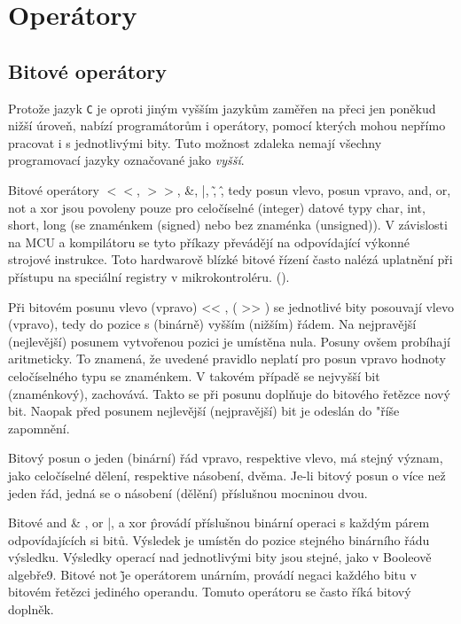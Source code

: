   \section{Operátory}
    \subsection{Bitové  operátory}
      Protože jazyk \texttt{C} je oproti jiným vyšším jazykům zaměřen na přeci jen poněkud nižší 
      úroveň, 
      nabízí programátorům i operátory, pomocí kterých mohou nepřímo pracovat i s jednotlivými bity.
      Tuto možnost zdaleka nemají všechny programovací jazyky označované jako \emph{vyšší}.
      
      Bitové operátory \(<<\), \(>>\), \&, |, \~, \^, tedy posun vlevo, posun vpravo, and, or, not 
      a xor jsou povoleny pouze pro celočíselné (integer) datové typy char, int, short, long (se 
      znaménkem (signed) nebo bez znaménka (unsigned)). V závislosti na MCU a kompilátoru se tyto 
      příkazy převádějí na odpovídající výkonné strojové instrukce. Toto hardwarově blízké bitové 
      řízení často nalézá uplatnění při přístupu na speciální registry v mikrokontroléru. 
      (\cite[s.~79]{Burkhard2003}).
      
      Při bitovém posunu vlevo (vpravo) << , ( >> ) se jednotlivé bity posouvají vlevo (vpravo), 
      tedy do pozice s (binárně) vyšším (nižším) řádem. Na nejpravější (nejlevější) posunem 
      vytvořenou pozici je umístěna nula. Posuny ovšem probíhají aritmeticky. To znamená, že 
      uvedené pravidlo neplatí pro posun vpravo hodnoty celočíselného typu se znaménkem. V takovém 
      případě se nejvyšší bit (znaménkový), zachovává. Takto se při posunu doplňuje do bitového 
      řetězce nový bit. Naopak před posunem nejlevější (nejpravější) bit je odeslán do
      "říše zapomnění.
      
      Bitový posun o jeden (binární) řád vpravo, respektive vlevo, má stejný význam, jako 
      celočíselné dělení, respektive násobení, dvěma. Je-li bitový posun o více než jeden řád, 
      jedná se o násobení (dělění) příslušnou mocninou dvou.
      
      Bitové and \& , or |, a xor \^ provádí příslušnou binární operaci s každým párem 
      odpovídajících si bitů. Výsledek je umístěn do pozice stejného binárního řádu výsledku. 
      Výsledky operací nad jednotlivými bity jsou  stejné, jako v Booleově algebře9. Bitové not \~ 
      je operátorem unárním, provádí negaci každého bitu v bitovém řetězci jediného operandu. 
      Tomuto operátoru se často říká bitový doplněk. 
      
